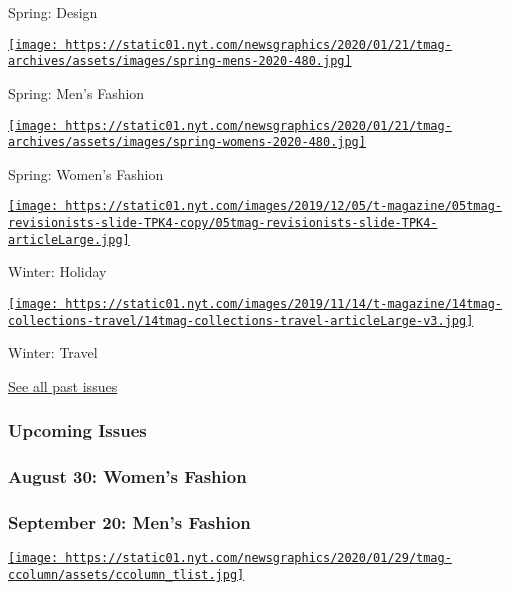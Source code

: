 Spring: Design

\href{https://www.nytimes.com/issue/t-magazine/2020/02/21/ts-march-8-mens-fashion-issue}{\texttt{[image: https://static01.nyt.com/newsgraphics/2020/01/21/tmag-archives/assets/images/spring-mens-2020-480.jpg]}}

Spring: Men's Fashion

\href{https://www.nytimes.com/issue/t-magazine/2020/02/06/ts-feb-23-womens-fashion-issue}{\texttt{[image: https://static01.nyt.com/newsgraphics/2020/01/21/tmag-archives/assets/images/spring-womens-2020-480.jpg]}}

Spring: Women's Fashion

\href{https://www.nytimes.com/issue/t-magazine/2019/11/21/ts-dec-8-holiday-issue}{\texttt{[image: https://static01.nyt.com/images/2019/12/05/t-magazine/05tmag-revisionists-slide-TPK4-copy/05tmag-revisionists-slide-TPK4-articleLarge.jpg]}}

Winter: Holiday

\href{https://www.nytimes.com/issue/t-magazine/2019/11/04/ts-nov-17-travel-issue}{\texttt{[image: https://static01.nyt.com/images/2019/11/14/t-magazine/14tmag-collections-travel/14tmag-collections-travel-articleLarge-v3.jpg]}}

Winter: Travel

\href{https://www.nytimes.com/interactive/2020/t-magazine/past-issues.html}{See
all past issues}

\hypertarget{upcoming-issues}{%
\subsubsection{Upcoming Issues}\label{upcoming-issues}}

\hypertarget{august-30-womens-fashion}{%
\subsubsection{August 30: Women's
Fashion}\label{august-30-womens-fashion}}

\hypertarget{september-20-mens-fashion}{%
\subsubsection{September 20: Men's
Fashion}\label{september-20-mens-fashion}}

\href{https://www.nytimes.com/newsletters/t-list}{\texttt{[image: https://static01.nyt.com/newsgraphics/2020/01/29/tmag-ccolumn/assets/ccolumn\_tlist.jpg]}}


